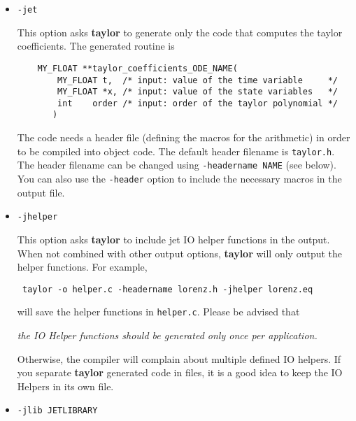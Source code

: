 \documentclass[10pt]{article}
\theoremstyle{remark}
\newcommand{\taylorname}{{\bf taylor}}
\begin{document}
\begin{itemize}
{Moreover, if the flag {\tt -name ODENAME} is also used, the
header file will also contain the prototypes for the main functions of
the Taylor integrator.}

\item{\verb+-jet+

This option asks \taylorname{} to generate only the code that computes
the taylor coefficients. The generated routine is

\begin{verbatim}
    MY_FLOAT **taylor_coefficients_ODE_NAME(
        MY_FLOAT t,  /* input: value of the time variable     */
        MY_FLOAT *x, /* input: value of the state variables   */
        int    order /* input: order of the taylor polynomial */
       )
\end{verbatim}

The code needs a header file (defining the macros for the arithmetic)
in order to be compiled into object code. The default header filename
is {\tt taylor.h}.  The header filename can be changed using
{\verb+-headername NAME+} (see below).  You can also use the
{\verb+-header+} option to include the necessary macros in the output
file.}

\item{\verb+-jhelper+

This option asks \taylorname{} to include jet IO helper functions in
the output.  When not combined with other output options,
\taylorname{} will only output the helper functions. For example,

\verb+ taylor -o helper.c -headername lorenz.h -jhelper lorenz.eq+

will save the helper functions in \verb+helper.c+. Please be advised
that
\begin{center} 
{\em the IO Helper functions should be generated only once per
  application.}
\end{center} 
Otherwise, the compiler will complain about multiple defined IO
helpers.  If you separate \taylorname{} generated code in files, it is
a good idea to keep the IO Helpers in its own file.  }
\item{\verb+-jlib JETLIBRARY+ 

}
\end{itemize}
\end{document}
